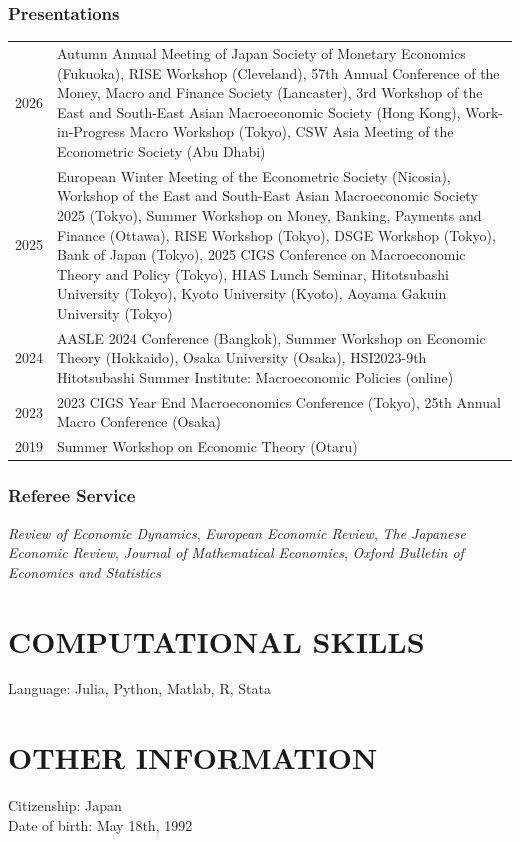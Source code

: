 \documentclass[12pt]{article}
\begin{document}
\subsubsection*{Presentations}
\begin{tabularx}{\linewidth}{@{}D X}
2026 & Autumn Annual Meeting of Japan Society of Monetary Economics (Fukuoka), RISE Workshop (Cleveland), 57th Annual Conference of the Money, Macro and Finance Society (Lancaster), 3rd Workshop of the East and South-East Asian Macroeconomic Society (Hong Kong), Work-in-Progress Macro Workshop (Tokyo), CSW Asia Meeting of the Econometric Society (Abu Dhabi)\\
2025&European Winter Meeting of the Econometric Society (Nicosia), Workshop of the East and South-East Asian Macroeconomic Society 2025 (Tokyo), Summer Workshop on Money, Banking, Payments and Finance (Ottawa), RISE Workshop (Tokyo), DSGE Workshop (Tokyo), Bank of Japan (Tokyo), 2025 CIGS Conference on Macroeconomic Theory and Policy (Tokyo), HIAS Lunch Seminar, Hitotsubashi University (Tokyo), Kyoto University (Kyoto), Aoyama Gakuin University (Tokyo)\\
2024&AASLE 2024 Conference (Bangkok), Summer Workshop on Economic Theory (Hokkaido), Osaka University (Osaka), HSI2023-9th Hitotsubashi Summer Institute: Macroeconomic Policies (online)\\
2023&2023 CIGS Year End Macroeconomics Conference (Tokyo), 25th Annual Macro Conference (Osaka)\\
2019&Summer Workshop on Economic Theory (Otaru)
\end{tabularx}
\subsubsection*{Referee Service}
\textit{Review of Economic Dynamics}, \textit{European Economic Review}, \textit{The Japanese Economic Review}, \textit{Journal of Mathematical Economics}, \textit{Oxford Bulletin of Economics and Statistics}

\section*{COMPUTATIONAL SKILLS}
Language: Julia, Python, Matlab, R, Stata

\section*{OTHER INFORMATION}
Citizenship: Japan\\
Date of birth: May 18th, 1992
\end{document}
